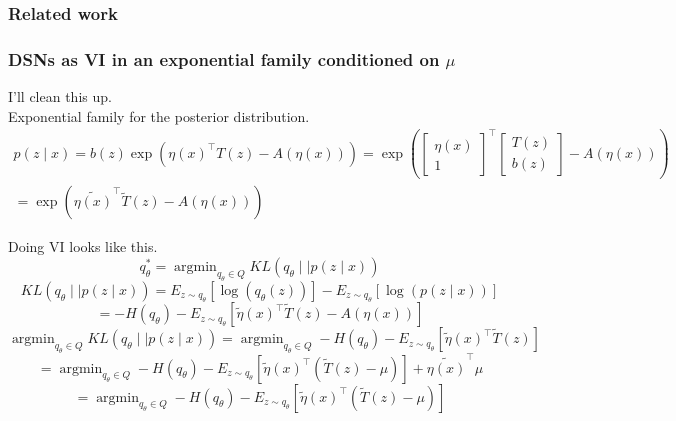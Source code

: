 \documentclass[11pt]{article}
\DeclareMathOperator*{\argmin}{argmin}
\begin{document}
\subsubsection{Related work}


\subsubsection{DSNs as VI in an exponential family conditioned on $\mu$}
I'll clean this up. \\

Exponential family for the posterior distribution.
\begin{equation}
\begin{split}
p(z \mid x) = b(z) \exp{\left( \eta(x)^\top T(z) - A(\eta(x)) \right)} = \exp{\left( \begin{bmatrix} \eta(x) \\ 1 \end{bmatrix}^\top \begin{bmatrix} T(z) \\ b(z) \end{bmatrix} - A(\eta(x)) \right)} \\= \exp{\left(\tilde{\eta(x)}^\top \tilde{T}(z) - A(\eta(x)) \right)} 
\end{split}
\end{equation}

Doing VI looks like this.
\begin{equation}
q_\theta^* = \argmin_{q_\theta \in Q} KL(q_\theta \mid \mid p(z \mid x))
\end{equation}
\begin{equation}
KL(q_\theta \mid \mid p(z \mid x)) = E_{z \sim q_\theta} \left[ \log (q_\theta(z)) \right] - E_{z \sim q_\theta} \left[ \log (p(z \mid x)) \right]
\end{equation}
\begin{equation}
 = -H(q_\theta) - E_{z \sim q_\theta} \left[ \tilde{\eta}(x)^\top  \tilde{T}(z) - A(\eta(x)) \right]
\end{equation}
\begin{equation}
 \argmin_{q_\theta \in Q} KL(q_\theta \mid \mid p(z \mid x)) =  \argmin_{q_\theta \in Q} -H(q_\theta) - E_{z \sim q_\theta} \left[ \tilde{\eta}(x)^\top  \tilde{T}(z) \right]
 \end{equation}
 \begin{equation}
=  \argmin_{q_\theta \in Q} -H(q_\theta) - E_{z \sim q_\theta} \left[ \tilde{\eta}(x)^\top \left(  \tilde{T}(z) -\mu \right) \right] + \tilde{\eta(x)}^\top \mu
 \end{equation}
  \begin{equation}
=  \argmin_{q_\theta \in Q} -H(q_\theta) - E_{z \sim q_\theta} \left[ \tilde{\eta}(x)^\top \left(  \tilde{T}(z) -\mu \right) \right]
 \end{equation}
\end{document}
